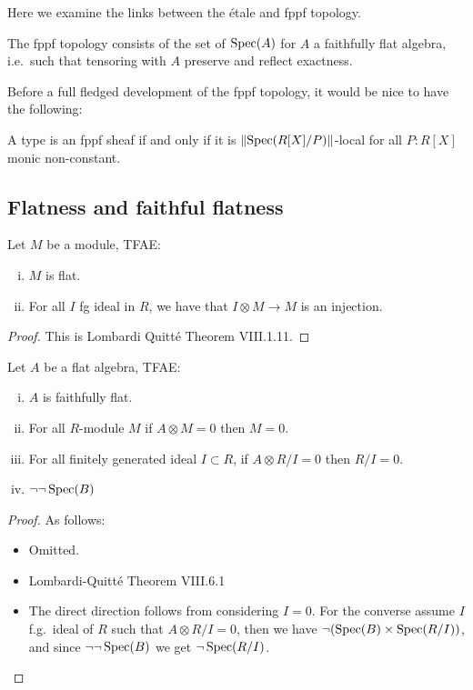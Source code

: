 Here we examine the links between the \'etale and fppf topology. 

\begin{definition}
The fppf topology consists of the set of $\operatorname{Spec}(A)$ for $A$ a faithfully flat algebra, i.e.\ such that tensoring with $A$ preserve and reflect exactness.
\end{definition}

Before a full fledged development of the fppf topology, it would be nice to have the following:

\begin{conjecture}
A type is an fppf sheaf if and only if it is $\lVert \operatorname{Spec}(R[X]/P) \rVert$-local for all $P:R[X]$ monic non-constant.
\end{conjecture}


\subsection{Flatness and faithful flatness}

\begin{lemma}
Let $M$ be a module, TFAE:
\begin{enumerate}[(i)]
\item $M$ is flat.
\item For all $I$ fg ideal in $R$, we have that $I\otimes M\to M$ is an injection.
\end{enumerate}
\end{lemma}

\begin{proof}
This is Lombardi Quitt\'e Theorem VIII.1.11.
\end{proof}

\begin{lemma}
Let $A$ be a flat algebra, TFAE:
\begin{enumerate}[(i)]
\item $A$ is faithfully flat.
\item For all $R$-module $M$ if $A\otimes M=0$ then $M=0$.
\item For all finitely generated ideal $I\subset R$, if $A\otimes R/I = 0$ then $R/I=0$.
\item $\neg\neg \operatorname{Spec}(B)$
\end{enumerate}
\end{lemma}

\begin{proof}
As follows:
\begin{itemize}
\item[(i) $\Leftrightarrow$ (ii)] Omitted.
\item[(ii) $\Leftrightarrow$ (iii)] Lombardi-Quitt\'e Theorem VIII.6.1
\item[(iii) $\Leftrightarrow$ (iv)] The direct direction follows from considering $I=0$. For the converse assume $I$ f.g.\ ideal of $R$ such that $A\otimes R/I = 0$, then we have $\neg(\operatorname{Spec}(B)\times \operatorname{Spec}(R/I))$, and since $\neg\neg\operatorname{Spec}(B)$ we get $\neg\operatorname{Spec}(R/I)$.
\end{itemize}
\end{proof}



